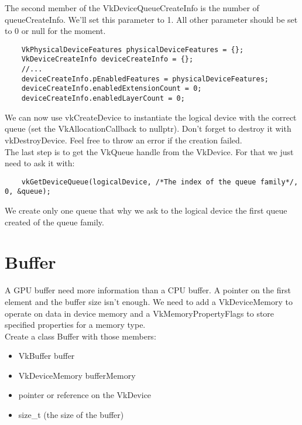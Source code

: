 \documentclass{article}
\begin{document}
The second member of the VkDeviceQueueCreateInfo is the number of queueCreateInfo. We'll set this parameter to 1. All other parameter should be set to 0 or null for the moment.
\begin{lstlisting}
	VkPhysicalDeviceFeatures physicalDeviceFeatures = {};
	VkDeviceCreateInfo deviceCreateInfo = {};
	//...
	deviceCreateInfo.pEnabledFeatures = physicalDeviceFeatures;
	deviceCreateInfo.enabledExtensionCount = 0;
	deviceCreateInfo.enabledLayerCount = 0;
\end{lstlisting}
We can now use vkCreateDevice to instantiate the logical device with the correct queue (set the VkAllocationCallback to nullptr). Don't forget to destroy it with vkDestroyDevice. Feel free to throw an error if the creation failed.\\
The last step is to get the VkQueue handle from the VkDevice. For that we just need to ask it with:
\begin{lstlisting}
	vkGetDeviceQueue(logicalDevice, /*The index of the queue family*/, 0, &queue);
\end{lstlisting}
We create only one queue that why we ask to the logical device the first queue created of the queue family.

\newpage
\section{Buffer}
A GPU buffer need more information than a CPU buffer. A pointer on the first element and the buffer size isn't enough. We need to add a VkDeviceMemory to operate on data in device memory and a VkMemoryPropertyFlags to store specified properties for a memory type.\\
Create a class Buffer with those members:
\begin{itemize}
	\item VkBuffer buffer
	\item VkDeviceMemory bufferMemory
	\item pointer or reference on the VkDevice
	\item size\_t (the size of the buffer)
\end{itemize}
\end{document}
